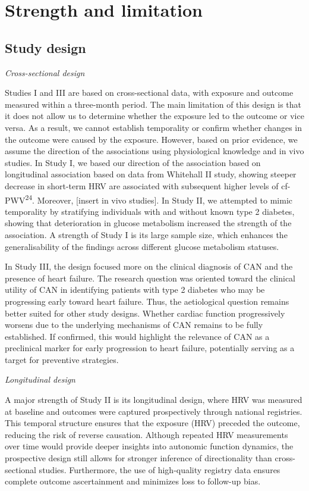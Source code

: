 \documentclass[
  a4paper,
  headsepline=true,
  open=any]{scrbook}
\begin{document}
\hypertarget{strength-and-limitation}{%
\section{Strength and limitation}\label{strength-and-limitation}}

\hypertarget{study-design}{%
\subsection{Study design}\label{study-design}}

\emph{Cross-sectional design}

Studies I and III are based on cross-sectional data, with exposure and
outcome measured within a three-month period. The main limitation of
this design is that it does not allow us to determine whether the
exposure led to the outcome or vice versa. As a result, we cannot
establish temporality or confirm whether changes in the outcome were
caused by the exposure. However, based on prior evidence, we assume the
direction of the associations using physiological knowledge and in vivo
studies. In Study I, we based our direction of the association based on
longitudinal association based on data from Whitehall II study, showing
steeper decrease in short-term HRV are associated with subsequent higher
levels of cf-PWV\textsuperscript{24}. Moreover, {[}insert in vivo
studies{]}. In Study II, we attempted to mimic temporality by
stratifying individuals with and without known type 2 diabetes, showing
that deterioration in glucose metabolism increased the strength of the
association. A strength of Study I is its large sample size, which
enhances the generalisability of the findings across different glucose
metabolism statuses.

In Study III, the design focused more on the clinical diagnosis of CAN
and the presence of heart failure. The research question was oriented
toward the clinical utility of CAN in identifying patients with type 2
diabetes who may be progressing early toward heart failure. Thus, the
aetiological question remains better suited for other study designs.
Whether cardiac function progressively worsens due to the underlying
mechanisms of CAN remains to be fully established. If confirmed, this
would highlight the relevance of CAN as a preclinical marker for early
progression to heart failure, potentially serving as a target for
preventive strategies.

\emph{Longitudinal design}

A major strength of Study II is its longitudinal design, where HRV was
measured at baseline and outcomes were captured prospectively through
national registries. This temporal structure ensures that the exposure
(HRV) preceded the outcome, reducing the risk of reverse causation.
Although repeated HRV measurements over time would provide deeper
insights into autonomic function dynamics, the prospective design still
allows for stronger inference of directionality than cross-sectional
studies. Furthermore, the use of high-quality registry data ensures
complete outcome ascertainment and minimizes loss to follow-up bias.
\end{document}
